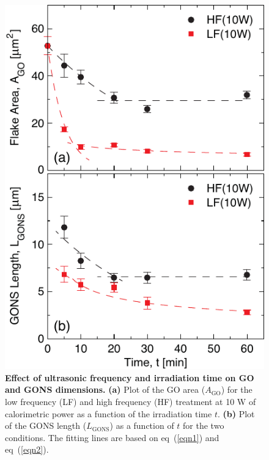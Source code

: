 \begin{figure}[t!]
  \centering
  \includegraphics{paper1/Fig4.pdf}
  \caption{\textbf{Effect of ultrasonic frequency and irradiation time on GO and GONS dimensions.} \textbf{(a)} Plot of the GO area ($A_{\mathrm{GO}}$) for the low frequency (LF) and high frequency (HF) treatment at 10 W of calorimetric power as a function of the irradiation time $t$. \textbf{(b)} Plot of the GONS length ($L_{\mathrm{GONS}}$) as a function of $t$ for the two conditions. The fitting lines are based on eq~(\ref{eqn1}) and eq~(\ref{eqn2}).}
  \label{fig4}
\end{figure}
